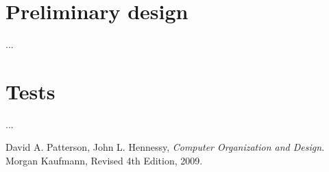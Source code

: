 \documentclass[11pt,twoside,a4paper]{article}
\begin{document}
\newpage
\pagestyle{fancy}
\section{Preliminary design}
...

\newpage
\pagestyle{fancy}
\section{Tests}
...

\newpage
\pagestyle{fancy}
\begin{thebibliography}{9}

  David A. Patterson, John L. Hennessy,
  \emph{Computer Organization and Design}.
  Morgan Kaufmann,
  Revised 4th Edition,
  2009.

\end{thebibliography}
\end{document}
